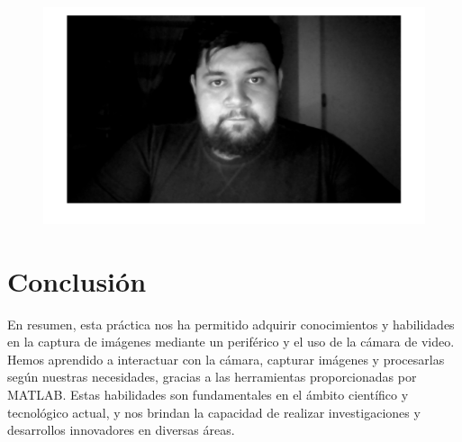 \documentclass{article}
\begin{document}
	\begin{figure}[!]
		\centering
		\includegraphics[width=\textwidth]{img2.png}
	\end{figure}
	
	
	\newpage
	
	\section{Conclusión}
	
	En resumen, esta práctica nos ha permitido adquirir conocimientos y habilidades en la captura de imágenes mediante un periférico y el uso de la cámara de video. Hemos aprendido a interactuar con la cámara, capturar imágenes y procesarlas según nuestras necesidades, gracias a las herramientas proporcionadas por MATLAB. Estas habilidades son fundamentales en el ámbito científico y tecnológico actual, y nos brindan la capacidad de realizar investigaciones y desarrollos innovadores en diversas áreas.
	
\end{document}
